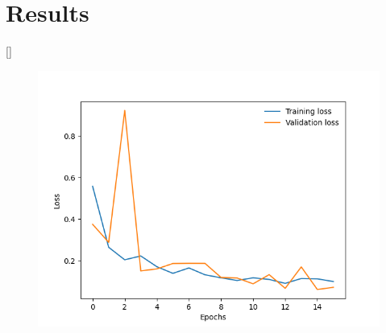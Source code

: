 \section{Results}
\autoref{}
\begin{figure}[!h]
    \centering
    \includegraphics[width=\columnwidth,keepaspectratio]
    {./figures/mobile_model_apple_trees_16its_2022-11-15_training_curve}
    \caption{
    }
    \label{fig:apple-tree-mode-training-curve}
\end{figure}
